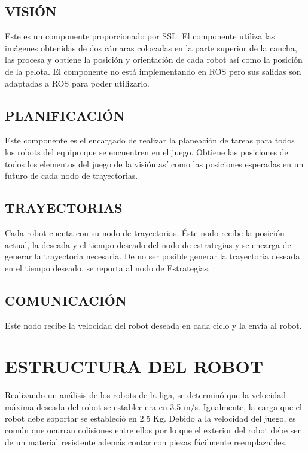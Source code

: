 \documentclass[twocolumn,10pt]{amrob}
\begin{document}
\subsection*{VISIÓN}
Este es un componente proporcionado por SSL. El componente utiliza las imágenes obtenidas de dos cámaras colocadas en la parte superior de la cancha, las procesa y obtiene la posición y orientación de cada robot así como la posición de la pelota. El componente no está implementando en ROS pero sus salidas son adaptadas a ROS para poder utilizarlo.
\subsection*{PLANIFICACIÓN}
Este componente es el encargado de realizar la planeación de tareas para todos los robots del equipo que se encuentren en el juego. Obtiene las posiciones de todos los elementos del juego de la visión así como las posiciones esperadas en un futuro de cada nodo de trayectorias.
\subsection*{TRAYECTORIAS}
Cada robot cuenta con su nodo de trayectorias. Éste nodo recibe la posición actual, la deseada y el tiempo deseado del nodo de estrategias y se encarga de generar la trayectoria necesaria. De no ser posible generar la trayectoria deseada en el tiempo deseado, se reporta al nodo de Estrategias.
\subsection*{COMUNICACIÓN}
Este nodo recibe la velocidad del robot deseada en cada ciclo y la envía al robot. 
\section*{ESTRUCTURA DEL ROBOT}

Realizando un análisis de los robots de la liga, se determinó que la velocidad máxima deseada del robot se estableciera en 3.5 m/s. Igualmente, la carga que el robot debe soportar se estableció en 2.5 Kg. Debido a la velocidad del juego, es común que ocurran colisiones entre ellos por lo que el exterior del robot debe ser de un material resistente además contar con piezas fácilmente reemplazables.\par
\end{document}
